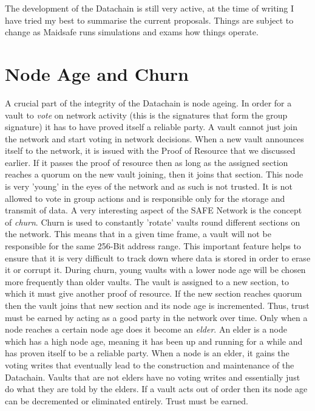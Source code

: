 The development of the Datachain is still very active, at the time of writing I have tried my best to summarise the current proposals. Things are subject to change as Maidsafe runs simulations and exams how things operate.

\section{Node Age and Churn}

A crucial part of the integrity of the Datachain is node ageing. In order for a vault to \textit{vote} on network activity (this is the signatures that form the group signature) it has to have proved itself a reliable party. A vault cannot just join the network and start voting in network decisions. When a new vault announces itself to the network, it is issued with the Proof of Resource that we discussed earlier. If it passes the proof of resource then as long as the assigned section reaches a quorum on the new vault joining, then it joins that section. This node is very 'young' in the eyes of the network and as such is not trusted. It is not allowed to vote in group actions and is responsible only for the storage and transmit of data. A very interesting aspect of the SAFE Network is the concept of \textit{churn}. Churn is used to constantly 'rotate' vaults round different sections on the network. This means that in a given time frame, a vault will not be responsible for the same 256-Bit address range. This important feature helps to ensure that it is very difficult to track down where data is stored in order to erase it or corrupt it. During churn, young vaults with a lower node age will be chosen more frequently than older vaults. The vault is assigned to a new section, to which it must give another proof of resource. If the new section reaches quorum then the vault joins that new section and its node age is incremented. Thus, trust must be earned by acting as a good party in the network over time. Only when a node reaches a certain node age does it become an \textit{elder}. An elder is a node which has a high node age, meaning it has been up and running for a while and has proven itself to be a reliable party. When a node is an elder, it gains the voting writes that eventually lead to the construction and maintenance of the Datachain. Vaults that are not elders have no voting writes and essentially just do what they are told by the elders. If a vault acts out of order then its node age can be decremented or eliminated entirely. Trust must be earned.

